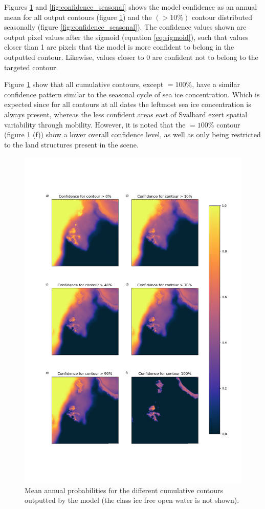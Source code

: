 \documentclass[../main/thesis.tex]{subfiles}
\begin{document}
Figures \ref{fig:mean_annual_confidence} and \ref{fig:confidence_seasonal} shows the model confidence as an annual mean for all output contours (figure \ref{fig:mean_annual_confidence}) and the $(> 10\%)$ contour distributed seasonally (figure \ref{fig:confidence_seasonal}). The confidence values shown are output pixel values after the sigmoid (equation \ref{eq:sigmoid}), such that values closer than 1 are pixels that the model is more confident to belong in the outputted contour. Likewise, values closer to 0 are confident not to belong to the targeted contour.

Figure \ref{fig:mean_annual_confidence} show that all cumulative contours, except $=100\%$, have a similar confidence pattern similar to the seasonal cycle of sea ice concentration. Which is expected since for all contours at all dates the leftmost sea ice concentration is always present, whereas the less confident areas east of Svalbard exert spatial variability through mobility. However, it is noted that the $=100\%$ contour (figure \ref{fig:mean_annual_confidence} (f)) show a lower overall confidence level, as well as only being restricted to the land structures present in the scene.

\begin{figure}
    \centering
    \includegraphics[width=.8\textwidth]{confidence_mean_annual}
    \caption{\label{fig:mean_annual_confidence}Mean annual probabilities for the different cumulative contours outputted by the model (the class ice free open water is not shown).}
\end{figure}
\end{document}
